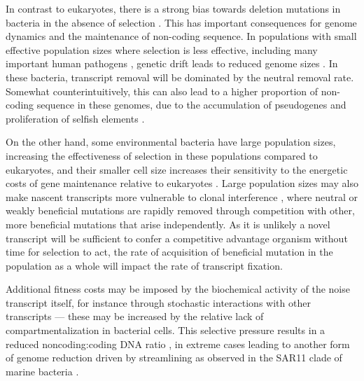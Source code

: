 In contrast to eukaryotes, there is a strong bias towards deletion mutations in bacteria in the absence of selection \citep{Kudla2009-iw,Nilsson2005-lr}. This has important consequences for genome dynamics and the maintenance of non-coding sequence. In populations with small effective population sizes where selection is less effective, including many important human pathogens \citep{Weinert2017-pj}, genetic drift leads to reduced genome sizes \citep{Kuo2009-wd}. In these bacteria, transcript removal will be dominated by the neutral removal rate. Somewhat counterintuitively, this can also lead to a higher proportion of non-coding sequence in these genomes, due to the accumulation of pseudogenes and proliferation of selfish elements \citep{Novichkov2009-yy}.\par 

On the other hand, some environmental bacteria have large population sizes, increasing the effectiveness of selection in these populations compared to eukaryotes, and their smaller cell size increases their sensitivity to the energetic costs of gene maintenance relative to eukaryotes \citep{Lynch2015-lc}. Large population sizes may also make nascent transcripts more vulnerable to clonal interference \citep{Fogle2008-of}, where neutral or weakly beneficial mutations are rapidly removed through competition with other, more beneficial mutations that arise independently. As it is unlikely a novel transcript will be sufficient to confer a competitive advantage organism without time for selection to act, the rate of acquisition of beneficial mutation in the population as a whole will impact the rate of transcript fixation.\par  

Additional fitness costs may be imposed by the biochemical activity of the noise transcript itself, for instance through stochastic interactions with other transcripts \citep{Umu2016-he} — these may be increased by the relative lack of compartmentalization in bacterial cells. This selective pressure results in a reduced noncoding:coding DNA ratio \citep{Novichkov2009-yy}, in extreme cases leading to another form of genome reduction driven by streamlining \citep{Batut2014-hm} as observed in the SAR11 clade of marine bacteria \citep{Giovannoni2005-ab}.\par 

